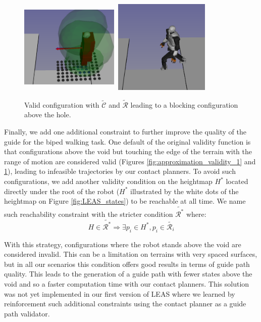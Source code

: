 \begin{figure}
    \centering
    \includegraphics[width=0.42\textwidth,height=4.5cm]{Figures/Chapter_LEAS/hole_scenario_above_void_p1.png}
    \includegraphics[width=0.42\textwidth,height=4.5cm]{Figures/Chapter_LEAS/hole_scenario_above_void.png}
    \caption{Valid configuration with $\tilde{\mathcal{C}}$ and $\tilde{\mathcal{R}}$ leading to a blocking configuration above the hole.}
    \label{fig:hole_scenario_above_void}
\end{figure}

Finally, we add one additional constraint to further improve the quality of the guide for the biped walking task. 
One default of the original validity function is that configurations above the void but touching the edge of the terrain with the range of motion are considered valid (Figures \ref{fig:approximation_validity_1} and \ref{fig:hole_scenario_above_void}), leading to infeasible trajectories by our contact planners.
To avoid such configurations, we add another validity condition on the heightmap $H^*$ located directly under the root of the robot ($H^*$ illustrated by the white dots of the heightmap on Figure \ref{fig:LEAS_states}) to be reachable at all time. 
We name such reachability constraint with the stricter condition $\tilde{\mathcal{R}^*}$ where:
\begin{equation}
    H \in \tilde{\mathcal{R}^*} \Rightarrow \exists p_i \in H^*, p_i \in \tilde{\mathcal{R}_i}
\end{equation}

With this strategy, configurations where the robot stands above the void are considered invalid. 
This can be a limitation on terrains with very spaced surfaces, but in all our scenarios this condition offers good results in terms of guide path quality.
This leads to the generation of a guide path with fewer states above the void and so a faster computation time with our contact planners.
This solution was not yet implemented in our first version of LEAS \cite{LEAS} where we learned by reinforcement such additional constraints using the contact planner as a guide path validator.

